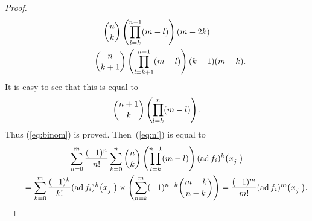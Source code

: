 \documentclass[pdftex]{sigma}
\theoremstyle{definition}
\numberwithin{equation}{section}
\DeclareMathOperator{\ad}{ad}
\begin{document}
\begin{proof}
\begin{gather*}
\begin{binom}
n
{k}
\end{binom} \left( \prod_{l=k}^{n-1} (m-l) \right) (m-2k)\\
\qquad {}-
\begin{binom}
n
{k+1}
\end{binom} \left( \prod_{l=k+1}^{n-1} (m-l) \right) (k+1)(m-k).
\end{gather*}
It is easy to see that this is equal to
\begin{gather*}
\begin{binom}
{n+1}
{k}
\end{binom} \left( \prod_{l=k}^{n} (m-l) \right).
\end{gather*}
Thus (\ref{eq:binom}) is proved. Then~(\ref{eq:n!}) is equal to
\begin{gather*}
 \sum_{n=0}^{m} \dfrac{(-1)^n}{n!} \sum_{k=0}^n \begin{binom}
n
k
\end{binom} \left(\prod_{l=k}^{n-1} (m-l)\right) (\ad f_i)^k\big(x_j^-\big) \\
 \qquad {} = \sum_{k=0}^m \dfrac{(-1)^k}{k!} (\ad f_i)^k\big(x_j^-\big) \times \left( \sum_{n=k}^{m} (-1)^{n-k} \begin{binom}
{m-k}
{n-k}
\end{binom} \right) = \dfrac{(-1)^m}{m!} (\ad f_i)^m\big(x_j^-\big).
\end{gather*}


\end{proof}
\end{document}
